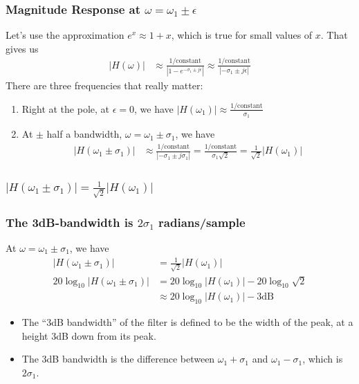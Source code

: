 \documentclass{beamer}
\begin{document}
\begin{frame}
  \frametitle{Magnitude Response at $\omega=\omega_1\pm\epsilon$}

  Let's use the approximation $e^x\approx 1+x$, which is true for
  small values of $x$.  That gives us
  \begin{align*}
    \left\vert H(\omega ) \right\vert & \approx
    \frac{1/\text{constant}}{|1-e^{-\sigma_1\pm j\epsilon}|} 
    \approx \frac{1/\text{constant}}{|-\sigma_1\pm j\epsilon|}
  \end{align*}
  There are three frequencies that really matter:
  \begin{enumerate}
  \item Right at the pole, at $\epsilon=0$, we have
    $\left\vert H(\omega_1)\right\vert\approx\frac{1/\text{constant}}{\sigma_1}$
  \item At $\pm$ half a bandwidth, $\omega=\omega_1\pm\sigma_1$, we have
    \begin{align*}
      \left\vert H(\omega_1\pm\sigma_1) \right\vert & \approx
      \frac{1/\text{constant}}{|-\sigma_1\pm j\sigma_1|}=
      \frac{1/\text{constant}}{\sigma_1\sqrt{2}}
      =\frac{1}{\sqrt{2}}|H(\omega_1)|
    \end{align*}
  \end{enumerate}
\end{frame}  

\begin{frame}
  \frametitle{$|H(\omega_1\pm\sigma_1)|=\frac{1}{\sqrt{2}}|H(\omega_1)|$}
  \centerline{}
\end{frame}

\begin{frame}
  \frametitle{The 3dB-bandwidth is $2\sigma_1$ radians/sample}

  At $\omega=\omega_1\pm\sigma_1$, we have
  \begin{align*}
    |H(\omega_1\pm\sigma_1)| &= \frac{1}{\sqrt{2}}|H(\omega_1)|\\
    20\log_{10}|H(\omega_1\pm\sigma_1)| &= 20\log_{10}|H(\omega_1)|-20\log_{10}\sqrt{2}\\
    &\approx 20\log_{10}|H(\omega_1)|-3\text{dB}
  \end{align*}
  \begin{itemize}
    \item The ``3dB bandwidth'' of the filter is defined to be the
      width of the peak, at a height 3dB down from its peak.
    \item The 3dB bandwidth is the difference between
      $\omega_1+\sigma_1$ and $\omega_1-\sigma_1$, which is
      $2\sigma_1$.
  \end{itemize}
\end{frame}  
\end{document}
